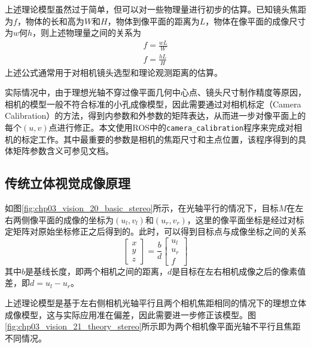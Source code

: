上述理论模型虽然过于简单，但可以对一些物理量进行初步的估算。已知镜头焦距为$f$，物体的长和高为$W$和$H$，物体到像平面的距离为$L$，物体在像平面的成像尺寸为$w$何$h$，则上述物理量之间的关系为
\begin{align}
f=\frac{wL}{W} \\
f=\frac{hL}{H}
\end{align}
上述公式通常用于对相机镜头选型和理论观测距离的估算。

实际情况中，由于理想光轴不穿过像平面几何中心点、镜头尺寸制作精度等原因，相机的模型一般不符合标准的小孔成像模型，因此需要通过对相机标定（Camera Calibration）的方法，得到内参数和外参数的矩阵表达，从而进一步对像平面上的每个$(u,v)$点进行修正。本文使用ROS中的\texttt{camera\_calibration}\cite{ros_camera_calibration}程序来完成对相机的标定工作。其中最重要的参数是相机的焦距尺寸和主点位置，该程序得到的具体矩阵参数含义可参见文档\cite{ros_camera_message}。

\subsection{传统立体视觉成像原理}
如图\ref{fig:chp03_vision_20_basic_stereo}所示，在光轴平行的情况下，目标$M$在左右两侧像平面的成像的坐标为$(u_l, v_l)$和$(u_r, v_r)$，这里的像平面坐标是经过对标定矩阵对原始坐标修正之后得到的。此时，可以得到目标点与成像坐标之间的关系
\begin{equation}
\left[ {\begin{array}{*{20}{c}}
	x \\ 
	y \\ 
	z 
	\end{array}} \right] =\frac{b}{d} \left[ {\begin{array}{*{20}{c}}
	u_l \\ 
	u_r \\ 
	f 
	\end{array}} \right]
\end{equation}
其中$b$是基线长度，即两个相机之间的距离，$d$是目标在左右相机成像之后的像素值差，即$d=u_l-u_r$。

上述理论模型是基于左右侧相机光轴平行且两个相机焦距相同的情况下的理想立体成像模型，这与实际应用准在偏差，因此需要进一步修正该模型。图\ref{fig:chp03_vision_21_theory_stereo}所示即为两个相机像平面光轴不平行且焦距不同情况。


